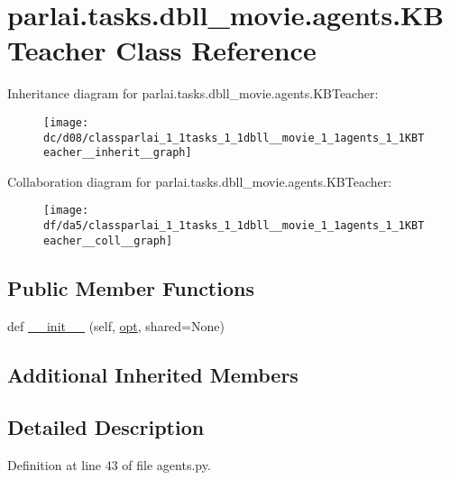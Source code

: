 \hypertarget{classparlai_1_1tasks_1_1dbll__movie_1_1agents_1_1KBTeacher}{}\section{parlai.\+tasks.\+dbll\+\_\+movie.\+agents.\+K\+B\+Teacher Class Reference}
\label{classparlai_1_1tasks_1_1dbll__movie_1_1agents_1_1KBTeacher}


Inheritance diagram for parlai.\+tasks.\+dbll\+\_\+movie.\+agents.\+K\+B\+Teacher\+:
\nopagebreak
\begin{figure}[H]
\begin{center}
\leavevmode
\texttt{[image: dc/d08/classparlai\_1\_1tasks\_1\_1dbll\_\_movie\_1\_1agents\_1\_1KBTeacher\_\_inherit\_\_graph]}
\end{center}
\end{figure}


Collaboration diagram for parlai.\+tasks.\+dbll\+\_\+movie.\+agents.\+K\+B\+Teacher\+:
\nopagebreak
\begin{figure}[H]
\begin{center}
\leavevmode
\texttt{[image: df/da5/classparlai\_1\_1tasks\_1\_1dbll\_\_movie\_1\_1agents\_1\_1KBTeacher\_\_coll\_\_graph]}
\end{center}
\end{figure}
\subsection*{Public Member Functions}
\begin{DoxyCompactItemize}
\item 
def \hyperlink{classparlai_1_1tasks_1_1dbll__movie_1_1agents_1_1KBTeacher_a073db440502a585121d5207fc9d9f992}{\+\_\+\+\_\+init\+\_\+\+\_\+} (self, \hyperlink{classparlai_1_1core_1_1teachers_1_1FbDialogTeacher_af7a9ec497b9cd0292d7b8fa220da7c28}{opt}, shared=None)
\end{DoxyCompactItemize}
\subsection*{Additional Inherited Members}


\subsection{Detailed Description}


Definition at line 43 of file agents.\+py.



